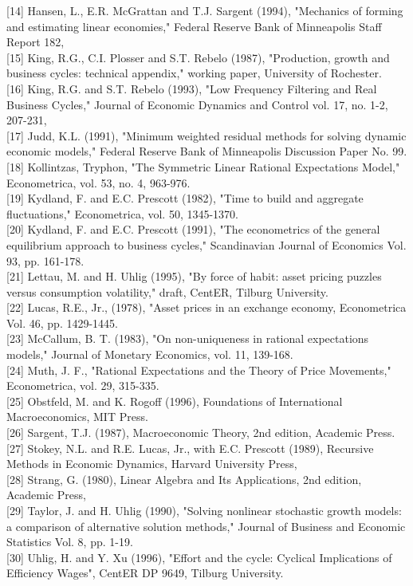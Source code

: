 \documentclass[10pt]{article}
\begin{document}
[14] Hansen, L., E.R. McGrattan and T.J. Sargent (1994), "Mechanics of forming and estimating linear economies," Federal Reserve Bank of Minneapolis Staff Report 182,\\[0pt]
[15] King, R.G., C.I. Plosser and S.T. Rebelo (1987), "Production, growth and business cycles: technical appendix," working paper, University of Rochester.\\[0pt]
[16] King, R.G. and S.T. Rebelo (1993), "Low Frequency Filtering and Real Business Cycles," Journal of Economic Dynamics and Control vol. 17, no. 1-2, 207-231,\\[0pt]
[17] Judd, K.L. (1991), "Minimum weighted residual methods for solving dynamic economic models," Federal Reserve Bank of Minneapolis Discussion Paper No. 99.\\[0pt]
[18] Kollintzas, Tryphon, "The Symmetric Linear Rational Expectations Model," Econometrica, vol. 53, no. 4, 963-976.\\[0pt]
[19] Kydland, F. and E.C. Prescott (1982), "Time to build and aggregate fluctuations," Econometrica, vol. 50, 1345-1370.\\[0pt]
[20] Kydland, F. and E.C. Prescott (1991), "The econometrics of the general equilibrium approach to business cycles," Scandinavian Journal of Economics Vol. 93, pp. 161-178.\\[0pt]
[21] Lettau, M. and H. Uhlig (1995), "By force of habit: asset pricing puzzles versus consumption volatility," draft, CentER, Tilburg University.\\[0pt]
[22] Lucas, R.E., Jr., (1978), "Asset prices in an exchange economy, Econometrica Vol. 46, pp. 1429-1445.\\[0pt]
[23] McCallum, B. T. (1983), "On non-uniqueness in rational expectations models," Journal of Monetary Economics, vol. 11, 139-168.\\[0pt]
[24] Muth, J. F., "Rational Expectations and the Theory of Price Movements," Econometrica, vol. 29, 315-335.\\[0pt]
[25] Obstfeld, M. and K. Rogoff (1996), Foundations of International Macroeconomics, MIT Press.\\[0pt]
[26] Sargent, T.J. (1987), Macroeconomic Theory, 2nd edition, Academic Press.\\[0pt]
[27] Stokey, N.L. and R.E. Lucas, Jr., with E.C. Prescott (1989), Recursive Methods in Economic Dynamics, Harvard University Press,\\[0pt]
[28] Strang, G. (1980), Linear Algebra and Its Applications, 2nd edition, Academic Press,\\[0pt]
[29] Taylor, J. and H. Uhlig (1990), "Solving nonlinear stochastic growth models: a comparison of alternative solution methods," Journal of Business and Economic Statistics Vol. 8, pp. 1-19.\\[0pt]
[30] Uhlig, H. and Y. Xu (1996), "Effort and the cycle: Cyclical Implications of Efficiency Wages", CentER DP 9649, Tilburg University.
\end{document}
